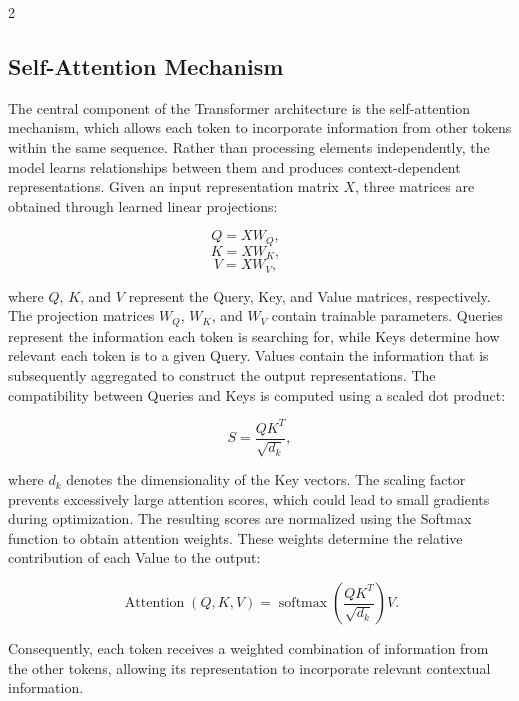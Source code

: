 \documentclass[10pt]{article}
\begin{document}
\begin{multicols}{2}
\subsection{Self-Attention Mechanism}
The central component of the Transformer architecture is the self-attention mechanism, 
which allows each token to incorporate information from other tokens within the same sequence. 
Rather than processing elements independently, 
the model learns relationships between them and produces context-dependent representations.
Given an input representation matrix \(X\), three matrices are obtained through learned linear projections:

\begin{equation}
Q = XW_Q,\qquad
\end{equation}
\begin{equation}
K = XW_K,\qquad
\end{equation}
\begin{equation}
V = XW_V,\qquad
\end{equation}


where \(Q\), \(K\), and \(V\) represent the Query, Key, and Value matrices, respectively. 
The projection matrices \(W_Q\), \(W_K\), and \(W_V\) contain trainable parameters.
Queries represent the information each token is searching for, 
while Keys determine how relevant each token is to a given Query. 
Values contain the information that is subsequently aggregated to construct the output representations.
The compatibility between Queries and Keys is computed using a scaled dot product:

\begin{equation}
S = \frac{QK^T}{\sqrt{d_k}},
\end{equation}

where \(d_k\) denotes the dimensionality of the Key vectors. 
The scaling factor prevents excessively large attention scores, which could lead to small gradients during optimization.
The resulting scores are normalized using the Softmax function to obtain attention weights. 
These weights determine the relative contribution of each Value to the output:

\begin{equation}
\operatorname{Attention}(Q,K,V)
=
\operatorname{softmax}
\left(
\frac{QK^T}{\sqrt{d_k}}
\right)V.
\end{equation}

Consequently, each token receives a weighted combination of information from the other tokens, 
allowing its representation to incorporate relevant contextual information.


\end{multicols}
\end{document}
